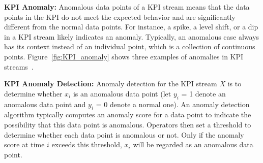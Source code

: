 

\textbf{KPI Anomaly: }Anomalous data points of a KPI stream means that the data points in the KPI do not meet the expected behavior and are significantly different from the normal data points. For instance, a spike, a level shift, or a dip in a KPI stream likely indicates an anomaly. Typically, an anomalous case always has its context instead of an individual point, which is a collection of continuous points. Figure~\ref{fig:KPI_anomaly} shows three examples of anomalies in KPI streams~\cite{labelless}. 

\textbf{KPI Anomaly Detection: }Anomaly detection for the KPI stream $X$ is to determine whether $x_i$ is an anomalous data point (let $y_i$ = 1 denote an anomalous data point and $y_i$ = 0 denote a normal one). An anomaly detection algorithm typically computes an anomaly score for a data point to indicate the possibility that this data point is anomalous. Operators then set a threshold to determine whether each data point is anomalous or not. Only if the anomaly score at time $i$ exceeds this threshold, $x_i$ will be regarded as an anomalous data point. 



